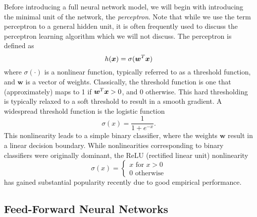 Before introducing a full neural network model, we will begin with introducing the minimal unit of the network, the \textit{perceptron}. Note that while we use the term perceptron to a general hidden unit, it is often frequently used to discuss the perceptron learning algorithm which we will not discuss. The perceptron is defined as 
\begin{equation}
    h(\bm{x}) = \sigma( \bm{w}^T \bm{x})
\end{equation}
where $\sigma(\cdot)$ is a nonlinear function, typically referred to as a threshold function, and $\bm{w}$ is a vector of weights. Classically, the threshold function is one that (approximately) maps to 1 if $\bm{w}^T \bm{x} > 0$, and $0$ otherwise. This hard thresholding is typically relaxed to a soft threshold to result in a smooth gradient. A widespread threshold function is the logistic function
\begin{equation}
    \sigma(x) = \frac{1}{1 + e^{-x}}.
\end{equation}
This nonlinearity leads to a simple binary classifier, where the weights $\bm{w}$ result in a linear decision boundary. 
While nonlinearities corresponding to binary classifiers were originally dominant, the ReLU (rectified linear unit) nonlinearity
\begin{equation}
    \sigma(x) = \begin{cases}
    x \,\,\text{for}\,\, x > 0\\
    0 \,\,\text{otherwise}
    \end{cases}
\end{equation}
has gained substantial popularity recently due to good empirical performance.

\subsection{Feed-Forward Neural Networks}

